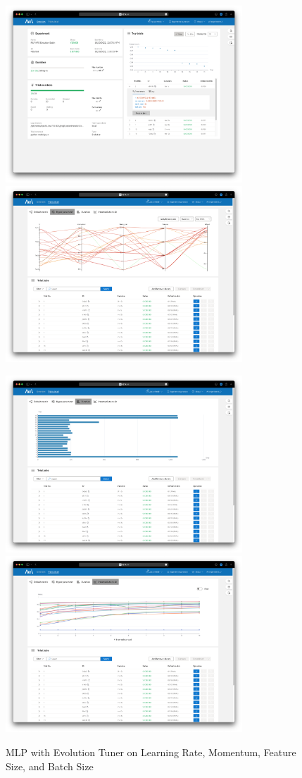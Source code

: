 \documentclass{article}
\begin{document}
\begin{figure}
    \centerline{\includegraphics[width=3.5in]{../proj3/figures/mlp_evolution_batch_overview.png}\includegraphics[width=3.5in]{../proj3/figures/mlp_evolution_batch_hyperparameter.png}}
    \centerline{\includegraphics[width=3.5in]{../proj3/figures/mlp_evolution_batch_latency.png}\includegraphics[width=3.5in]{../proj3/figures/mlp_evolution_batch_intermediate.png}}
    \caption{MLP with Evolution Tuner on Learning Rate, Momentum, Feature Size, and Batch Size}
    \label{fig:mlp-evolution-batch}
\end{figure}
\end{document}
